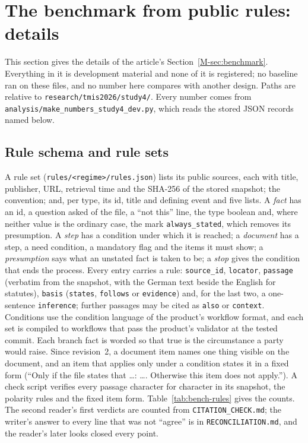 \clearpage
\section{The benchmark from public rules: details}
\label{supp:benchmark}

This section gives the details of the article's Section~\ref{M-sec:benchmark}. Everything in it is development material and none of it is registered; no baseline ran on these files, and no number here compares \casepath with another design. Paths are relative to \texttt{research/\allowbreak{}tmis2026/\allowbreak{}study4/}. Every number comes from \texttt{analysis/\allowbreak{}make\_numbers\_\allowbreak{}study4\_\allowbreak{}dev.py}, which reads the stored JSON records named below.

\subsection{Rule schema and rule sets}
\label{supp:bench-rules}

A rule set (\texttt{rules/\allowbreak{}<regime>/\allowbreak{}rules.json}) lists its public sources, each with title, publisher, URL, retrieval time and the SHA-256 of the stored snapshot; the convention; and, per type, its id, title and defining event and five lists. A \emph{fact} has an id, a question asked of the file, a ``not this'' line, the type boolean and, where neither value is the ordinary case, the mark \texttt{always\_stated}, which removes its presumption. A \emph{step} has a condition under which it is reached; a \emph{document} has a step, a need condition, a mandatory flag and the items it must show; a \emph{presumption} says what an unstated fact is taken to be; a \emph{stop} gives the condition that ends the process. Every entry carries a rule: \texttt{source\_id}, \texttt{locator}, \texttt{passage} (verbatim from the snapshot, with the German text beside the English for statutes), \texttt{basis} (\texttt{states}, \texttt{follows} or \texttt{evidence}) and, for the last two, a one-sentence \texttt{inference}; further passages may be cited as \texttt{also} or \texttt{context}. Conditions use the condition language of the product's workflow format, and each set is compiled to workflows that pass the product's validator at the tested commit. Each branch fact is worded so that true is the circumstance a party would raise. Since revision~2, a document item names one thing visible on the document, and an item that applies only under a condition states it in a fixed form (``Only if the file states that \ldots: \ldots. Otherwise this item does not apply.''). A check script verifies every passage character for character in its snapshot, the polarity rules and the fixed item form. Table~\ref{tab:bench-rules} gives the counts. The second reader's first verdicts are counted from \texttt{CITATION\_\allowbreak{}CHECK.md}; the writer's answer to every line that was not ``agree'' is in \texttt{RECONCILIATION.md}, and the reader's later looks closed every point.

